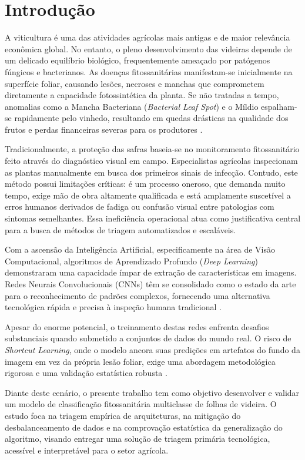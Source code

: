 \documentclass[12pt, a4paper]{article}
\begin{document}
\section{Introdução}
A viticultura é uma das atividades agrícolas mais antigas e de maior relevância econômica global. No entanto, o pleno desenvolvimento das videiras depende de um delicado equilíbrio biológico, frequentemente ameaçado por patógenos fúngicos e bacterianos. As doenças fitossanitárias manifestam-se inicialmente na superfície foliar, causando lesões, necroses e manchas que comprometem diretamente a capacidade fotossintética da planta. Se não tratadas a tempo, anomalias como a Mancha Bacteriana (\textit{Bacterial Leaf Spot}) e o Míldio espalham-se rapidamente pelo vinhedo, resultando em quedas drásticas na qualidade dos frutos e perdas financeiras severas para os produtores \citep{dharrao2025}.

Tradicionalmente, a proteção das safras baseia-se no monitoramento fitossanitário feito através do diagnóstico visual em campo. Especialistas agrícolas inspecionam as plantas manualmente em busca dos primeiros sinais de infecção. Contudo, este método possui limitações críticas: é um processo oneroso, que demanda muito tempo, exige mão de obra altamente qualificada e está amplamente suscetível a erros humanos derivados de fadiga ou confusão visual entre patologias com sintomas semelhantes. Essa ineficiência operacional atua como justificativa central para a busca de métodos de triagem automatizados e escaláveis.

Com a ascensão da Inteligência Artificial, especificamente na área de Visão Computacional, algoritmos de Aprendizado Profundo (\textit{Deep Learning}) demonstraram uma capacidade ímpar de extração de características em imagens. Redes Neurais Convolucionais (CNNs) têm se consolidado como o estado da arte para o reconhecimento de padrões complexos, fornecendo uma alternativa tecnológica rápida e precisa à inspeção humana tradicional \citep{geron2019hands}.

Apesar do enorme potencial, o treinamento destas redes enfrenta desafios substanciais quando submetido a conjuntos de dados do mundo real. O risco de \textit{Shortcut Learning}, onde o modelo ancora suas predições em artefatos do fundo da imagem em vez da própria lesão foliar, exige uma abordagem metodológica rigorosa e uma validação estatística robusta \citep{hastie2009elements}.

Diante deste cenário, o presente trabalho tem como objetivo desenvolver e validar um modelo de classificação fitossanitária multiclasse de folhas de videira. O estudo foca na triagem empírica de arquiteturas, na mitigação do desbalanceamento de dados e na comprovação estatística da generalização do algoritmo, visando entregar uma solução de triagem primária tecnológica, acessível e interpretável para o setor agrícola.
\end{document}
